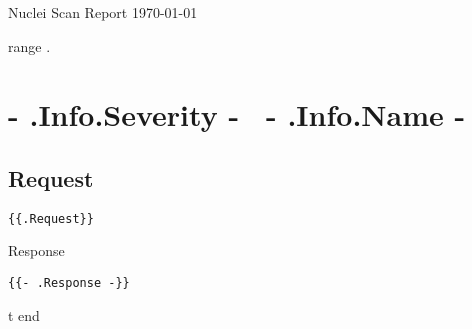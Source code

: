 \documentclass{article}
\begin{document}

\begin{titlepage}
\begin{center}
{\huge Nuclei Scan Report}
\vfill
\large{\today}

\end{center}
\end{titlepage}


{{range .}}

	\section{ \colorbox{ {{- .Info.Severity -}} }{ {{- .Info.Severity -}} }~{{- .Info.Name -}} }

	\subsection{Request}
	\begin{lstlisting}[style=http]
	{{.Request}}
	\end{lstlisting} 

	Response
	\begin{lstlisting}[style=http]
		{{- .Response -}}
	\end{lstlisting} 
t
{{end}}

\end{document}
